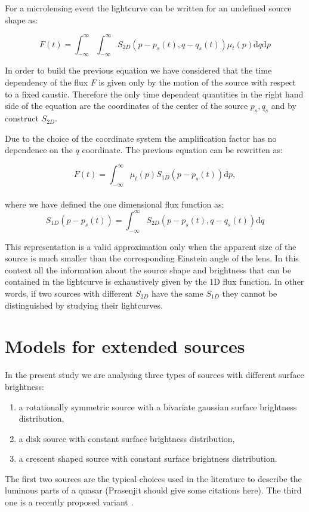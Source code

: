 For a microlensing event the lightcurve can be written for an undefined source shape as:

\begin{equation}
 F(t) = \int_{-\infty}^\infty \int_{-\infty}^\infty S_{2D}(p-p_s(t), q-q_s(t)) \mu_t(p) \mathrm{d}q \mathrm{d}p
 \label{eqn:ft2d}
\end{equation}

In order to build the previous equation we have considered that the time dependency of the flux $F$ is given only by the motion of the source with respect to a fixed caustic. Therefore the only time dependent quantities in the right hand side of the equation
are the coordinates of the center of the source $p_s,q_s$ and by construct $S_{2D}$. 

Due to the choice of the coordinate system the amplification factor has no dependence on the $q$ coordinate. The previous equation can be rewritten as:

\begin{equation}
 F(t) 
= \int_{-\infty}^\infty  \mu_t(p) S_{1D}\left(p-p_s(t)\right) \mathrm{d}p,
\label{eqn:ft}
\end{equation}
\\
where we have defined the one dimensional flux function as:
\begin{equation}
 S_{1D}(p-p_s(t)) = \int_{-\infty}^\infty S_{2D}(p-p_s(t), q-q_s(t)) \mathrm{d}q
\end{equation}

This representation is a valid approximation only when the apparent size of the source is much smaller than the corresponding Einstein angle of the lens. In this context 
all the information about the source shape and brightness that can be contained in the lightcurve is exhaustively given by the 1D flux function.
In other words, if two sources with different $S_{2D}$ have the same $S_{1D}$ they cannot be distinguished by studying their lightcurves.
 
 
\section{Models for extended sources}

In the present study we are analysing three types of sources with different surface brightness: 
\begin{enumerate}
 \renewcommand{\theenumi}{(\arabic{enumi})}
  \item a rotationally symmetric source with a bivariate gaussian surface brightness distribution,
  \item a disk source with constant surface brightness distribution,
  \item a crescent shaped source with constant surface brightness distribution.
\end{enumerate}
The first two sources are the typical choices used in the literature to describe the luminous parts of a quasar (Prasenjit should give some citations here). The third one is a recently proposed
variant \citep{2013MNRAS.434..765K}.




